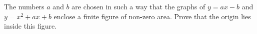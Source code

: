 \problem
The numbers $a$ and $b$ are chosen in such a way that the graphs of $y = ax - b$ and $y = x^2 + ax + b$ enclose a finite figure of non-zero area. 
Prove that the origin lies inside this figure.
\solution
\endproblem
